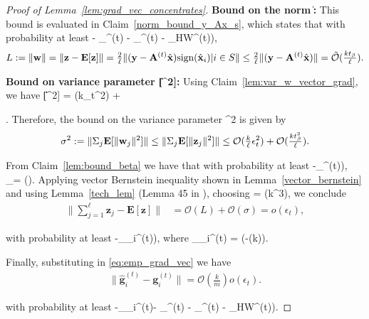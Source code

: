 \documentclass{article}
\newcommand{\sgn}{{\rm sign}}
\newcommand{\HT}{{\c{T}}}
\newcommand{\gradvec}{\b{g}_i}
\newcommand{\siri}[1]{{\color{black}{#1}}}
\def\[#1\]{{$#1$}}
\def\b#1{{\mathbf{#1}}}
\def\c#1{{\mathcal{#1}}}
\begin{document}
\begin{proof}[Proof of Lemma~\ref{lem:grad_vec_concentrates}]
	\noindent\textbf{Bound on the norm \[\|\b{w}\|\]: }
	This bound is evaluated in Claim~\ref{norm_bound_y_Ax_s}, which states that with probability at least \[(1 - \delta_{\beta}^{(t)} - \delta_{\HT}^{(t)} - \delta_{\rm HW}^{(t)})\],
	\begin{align*}
	L := \|\b{w}\| = \|\b{z}- \b{E}[\b{z}]\| =  \tfrac{2}{\ell}\| ( \b{y}- \b{A}^{(t)}\hat{\b{x}})\sgn(\hat{\b{x}}_i)|i\in S\| \leq \tfrac{2}{\ell}\| ( \b{y} - \b{A}^{(t)}\hat{\b{x}})\| = 
	
	 \siri{\tilde{\mathcal{O}}(\tfrac{kt_{\beta}}{\ell})}.
	\end{align*}
	

	\noindent\textbf{Bound on  variance parameter \[\b{E}[\|\b{w}\|^2]\]:}
	Using Claim~\ref{lem:var_w_vector_grad}, we have \[\b{E}[\|\b{z}\|^2] = (k\epsilon_t^2) +
	
	\siri{ \mathcal{O}( kt_{\beta}^2)}\]. Therefore, the bound on the variance parameter \[\sigma^2\] is given by
	\begin{align*}
	\sigma^2:=\|\Sigma_j \b{E}[\|\b{w}_j\|^2]\| \leq \|\Sigma_j \b{E}[\|\b{z}_j\|^2]\|\leq\mathcal{O}(\tfrac{k}{\ell}\epsilon_t^2) +
	
	\siri{ \mathcal{O}( \tfrac{kt_{\beta}^2}{\ell})}.
	\end{align*}
	
	From Claim~\ref{lem:bound_beta} we have that with probability at least \[(1-\delta_{\beta}^{(t)})\], \[t_\beta = ()\]. Applying vector Bernstein inequality shown in Lemma~\ref{vector_bernstein} and using Lemma~\ref{tech_lem} (Lemma 45 in \citep{Arora15}), choosing \[\ell = \tilde{\Omega}(k^3)\], we conclude
	\begin{align*}
	\|\textstyle \sum_{j=1}^{\ell}  \b{z}_j - \mathbf{E}[\b{z}]\| &= \mathcal{O}(L) + \mathcal{O}(\sigma) = o(\epsilon_t), 
	
	
	
	\end{align*}
	
	with probability at least \[(1 -\delta_{\gradvec}^{(t)})\], where \[\delta_{\gradvec}^{(t)} = \exp(-\Omega(k))\]. 







	Finally, substituting in \eqref{eq:emp_grad_vec} we have
	\begin{align*}
	\|\hat{\b{g}}_i^{(t)} - \b{g}_i^{(t)}\| = \mathcal{O}(\tfrac{k}{m})o(\epsilon_t).
	\end{align*}
	
	with probability at least \[(1 -\delta_{\gradvec}^{(t)}- \delta_{\beta}^{(t)} - \delta_{\HT}^{(t)} - \delta_{\rm HW}^{(t)})\].

\end{proof}
\end{document}
